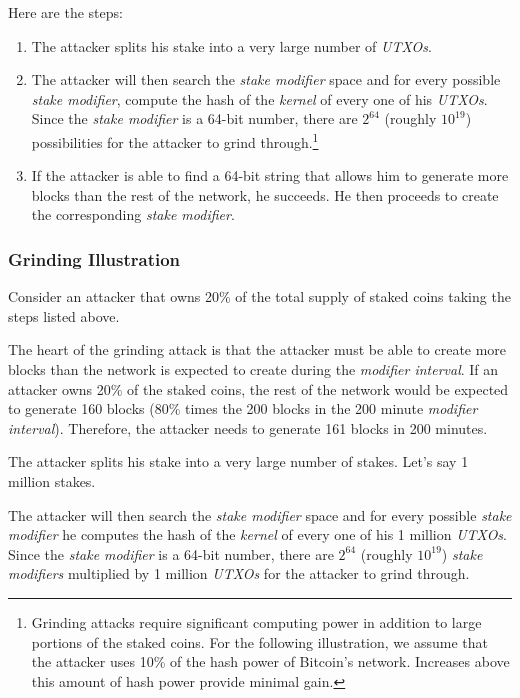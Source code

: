 \documentclass[a4paper,11pt]{article}
\begin{document}
Here are the steps:
\begin{enumerate}
\setlength{\itemsep}{0pt}
\item{The attacker splits his stake into a very large number of \textit{UTXOs}.}
\item{The attacker will then search the \textit{stake modifier} space and for every possible \textit{stake modifier}, compute the hash of the \textit{kernel} of every one of his \textit{UTXOs}. Since the \textit{stake modifier} is a 64-bit number, there are $2^{64}$ (roughly $10^{19}$) possibilities for the attacker to grind through.\footnote{Grinding attacks require significant computing power in addition to large portions of the staked coins. For the following illustration, we assume that the attacker uses 10\% of the hash power of Bitcoin's network. Increases above this amount of hash power provide minimal gain.}}
\item{If the attacker is able to find a 64-bit string that allows him to generate more blocks than the rest of the network, he succeeds. He then proceeds to create the corresponding \textit{stake modifier}.}

\end{enumerate}

\subsubsection*{Grinding Illustration}

Consider an attacker that owns 20\% of the total supply of staked coins taking the steps listed above.

The heart of the grinding attack is that the attacker must be able to create more blocks than the network is expected to create during the \textit{modifier interval}. If an attacker owns 20\% of the staked coins, the rest of the network would be expected to generate 160 blocks (80\% times the 200 blocks in the 200 minute \textit{modifier interval}). Therefore, the attacker needs to generate 161 blocks in 200 minutes.

The attacker splits his stake into a very large number of stakes. Let's say 1 million stakes.

The attacker will then search the \textit{stake modifier} space and for every possible \textit{stake modifier} he computes the hash of the \textit{kernel} of every one of his 1 million \textit{UTXOs}. Since the \textit{stake modifier} is a 64-bit number, there are $2^{64}$ (roughly $10^{19}$) \textit{stake modifiers} multiplied by 1 million \textit{UTXOs} for the attacker to grind through.
\end{document}
